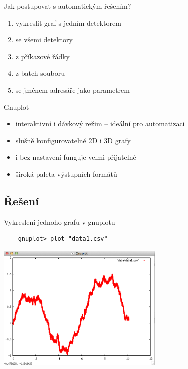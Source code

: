\documentclass{beamer}
\begin{document}
\begin{frame}{Jak postupovat s automatickým řešením?}
  \begin{enumerate}
    \item vykreslit graf s jedním detektorem
    \pause
    \item se všemi detektory
    \pause
    \item z příkazové řádky
    \pause
    \item z batch souboru
    \pause
    \item se jménem adresáře jako parametrem
  \end{enumerate}
\end{frame}

\begin{frame}{Gnuplot}
  \begin{itemize}
    \item interaktivní i dávkový režim -- ideální pro automatizaci
    \item slušně konfigurovatelné 2D i 3D grafy
    \item i bez nastavení funguje velmi přijatelně
    \item široká paleta výstupních formátů
  \end{itemize}
\end{frame}

\subsection{Řešení}

\begin{frame}[fragile]{Vykreslení jednoho grafu v gnuplotu}
  \begin{verbatim}
    gnuplot> plot "data1.csv"
  \end{verbatim}
  \pause 
  \begin{center}
    \includegraphics[width=0.6\textwidth]{gnuplot_interactive}      
  \end{center}
\end{frame}
\end{document}
